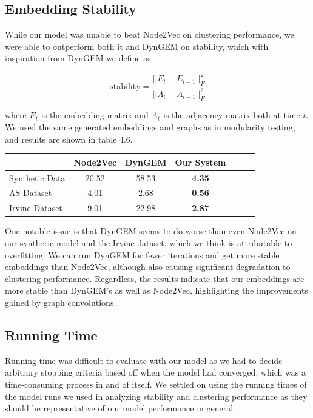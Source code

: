 \documentclass[12pt,twoside]{report}
\begin{document}
\subsection{Embedding Stability}

While our model was unable to beat Node2Vec on clustering performance, we were able to outperform both it and DynGEM on stability, which with inspiration from DynGEM we define as

\[ \text{stability} = \frac{|| E_t - E_{t-1}||^2_F}{||A_t - A_{t-1}||^2_F} \]
 
where $E_t$ is the embedding matrix and $A_t$ is the adjacency matrix both at time $t$. We used the same generated embeddings and graphs as in modularity testing, and results are shown in table 4.6. \\

\begin{center}
\begin{tabular}{l*{5}{c}r}
              & Node2Vec & DynGEM & Our System \\
\hline
Synthetic Data    & 20.52 & 58.53 & \textbf{4.35}  \\
AS Dataset   & 4.01 & 2.68 & \textbf{0.56}  \\
Irvine Dataset   & 9.01 & 22.98 & \textbf{2.87}  \\
\end{tabular}
\end{center} 

One notable issue is that DynGEM seems to do worse than even Node2Vec on our synthetic model and the  Irvine dataset, which we think is attributable to overfitting. We can run DynGEM for fewer iterations and get more stable embeddings than Node2Vec, although also causing significant degradation to clustering performance. Regardless, the results indicate that our embeddings are more stable than DynGEM's as well as Node2Vec, highlighting the improvements gained by graph convolutions. \\

\subsection{Running Time}

Running time was difficult to evaluate with our model as we had to decide arbitrary stopping criteria based off when the model had converged, which was a time-consuming process in and of itself. We settled on using the running times of the model runs we used in analyzing stability and clustering performance as they should be representative of our model performance in general. \\
\end{document}
